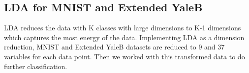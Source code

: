 \subsection{LDA for MNIST and Extended YaleB}
LDA reduces the data with K classes with large dimensions to K-1 dimensions which captures the most energy of the data. Implementing LDA as a dimension reduction, MNIST and Extended YaleB datasets are reduced to 9 and 37 variables for each data point. Then we worked with this transformed data to do further classification. 
